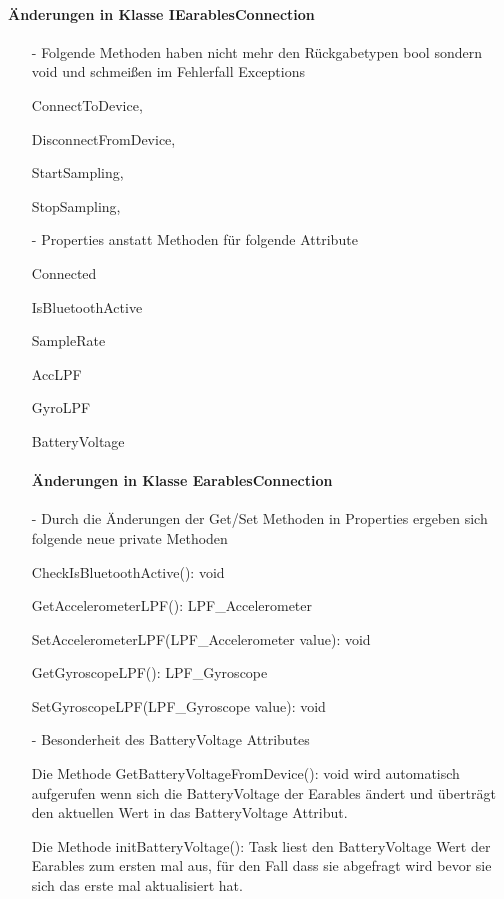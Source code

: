 \documentclass[a4paper,12pt]{article}
\begin{document}
\paragraph{Änderungen in Klasse IEarablesConnection}
\begin{itemize}
	\item[-] Folgende Methoden haben nicht mehr den Rückgabetypen bool sondern void und schmeißen im Fehlerfall Exceptions
	\item[] ConnectToDevice,
	\item[] DisconnectFromDevice,
	\item[] StartSampling,
	\item[] StopSampling,
	\item[] 

	\item[-] Properties anstatt Methoden für folgende Attribute
	\item[] Connected
	\item[] IsBluetoothActive
	\item[] SampleRate
	\item[] AccLPF
	\item[] GyroLPF
	\item[] BatteryVoltage
	\item[] 

	\paragraph{Änderungen in Klasse EarablesConnection}
	
	\item[-] Durch die Änderungen der Get/Set Methoden in Properties ergeben sich folgende neue private Methoden
	\item[] CheckIsBluetoothActive(): void
	\item[] GetAccelerometerLPF(): LPF\_Accelerometer
	\item[] SetAccelerometerLPF(LPF\_Accelerometer value): void
	\item[] GetGyroscopeLPF(): LPF\_Gyroscope
	\item[] SetGyroscopeLPF(LPF\_Gyroscope value): void
	\item[] 

	
	\item[-] Besonderheit des BatteryVoltage Attributes
	\item[] Die Methode GetBatteryVoltageFromDevice(): void wird automatisch aufgerufen wenn sich die BatteryVoltage der Earables ändert und überträgt den aktuellen Wert in das BatteryVoltage Attribut.
	\item[] Die Methode initBatteryVoltage(): Task liest den BatteryVoltage Wert der Earables zum ersten mal aus, für den Fall dass sie abgefragt wird bevor sie sich das erste mal aktualisiert hat.
\end{itemize}
\end{document}
